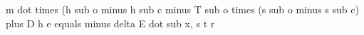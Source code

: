 m dot times (h sub o minus h sub c minus T sub o times (s sub o minus s sub c) plus D h e equals minus delta E dot sub x, s t r